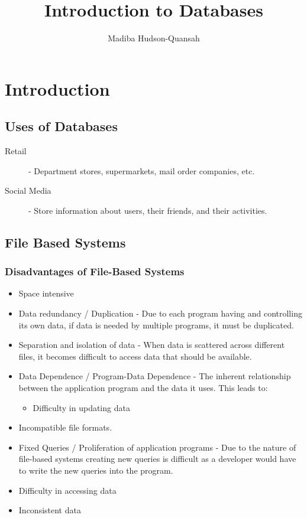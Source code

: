 \documentclass[12pt letter]{report}
\title{\Huge{Introduction to Databases}}
\author{\huge{Madiba Hudson-Quansah}}
\date{}
\begin{document}
\maketitle
\newpage
{}
\tableofcontents
\pagebreak

\chapter{Introduction}


\section{Uses of Databases}

\begin{description}
  \item[Retail]  - Department stores, supermarkets, mail order companies, etc.
  \item[Social Media] - Store information about users, their friends, and their activities.
\end{description}

\section{File Based Systems}


\subsection{Disadvantages of File-Based Systems}

\begin{itemize}
  \item Space intensive
  \item Data redundancy / Duplication - Due to each program having and controlling its own data, if data is needed by multiple programs, it must be duplicated.
  \item Separation and isolation of data - When data is scattered across different files, it becomes difficult to
        access data that should be available.
  \item Data Dependence / Program-Data Dependence - The inherent relationship between the application program and the data it uses. This leads
        to:
        \begin{itemize}
          \item Difficulty in updating data
        \end{itemize}
  \item Incompatible file formats.
  \item Fixed Queries / Proliferation of application programs - Due to the nature of file-based systems creating new
        queries is difficult as a developer would have to write the new queries into the program.
  \item Difficulty in accessing data
  \item Inconsistent data
\end{itemize}
\end{document}
